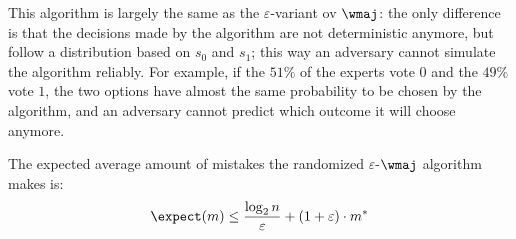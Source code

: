 This algorithm is largely the same as the $\varepsilon$-variant ov $\wmaj$: the only difference is that the decisions made by the algorithm are not deterministic anymore, but follow a distribution based on $s_0$ and $s_1$; this way an adversary cannot simulate the algorithm reliably. For example, if the $51\%$ of the experts vote $0$ and the $49\%$ vote $1$, the two options have almost the same probability to be chosen by the algorithm, and an adversary cannot predict which outcome it will choose anymore.

\begin{lemma}\label{lem:exp-rwm-erros}
    The expected average amount of mistakes the randomized $\varepsilon$-$\wmaj$ algorithm makes is:
    \[
        \expect(m) \leq \frac{\log_2 n}{\varepsilon} + (1 + \varepsilon) \cdot m^*
    \]
\end{lemma}

